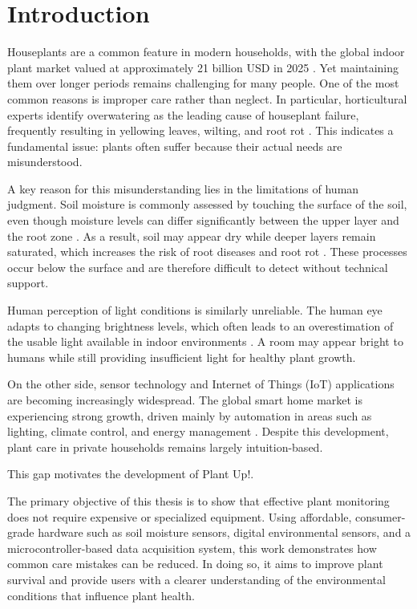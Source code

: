 \section{Introduction}

Houseplants are a common feature in modern households, with the global indoor plant market valued at approximately 21 billion USD in 2025 \cite{terrariumTribeStats2024}. Yet maintaining them over longer periods remains challenging for many people. One of the most common reasons is improper care rather than neglect. In particular, horticultural experts identify overwatering as the leading cause of houseplant failure, frequently resulting in yellowing leaves, wilting, and root rot \cite{lsuWaterWisely}. This indicates a fundamental issue: plants often suffer because their actual needs are misunderstood.

A key reason for this misunderstanding lies in the limitations of human judgment. Soil moisture is commonly assessed by touching the surface of the soil, even though moisture levels can differ significantly between the upper layer and the root zone \cite{lsuWaterWisely}. As a result, soil may appear dry while deeper layers remain saturated, which increases the risk of root diseases and root rot \cite{rootRotsWisc}. These processes occur below the surface and are therefore difficult to detect without technical support.

Human perception of light conditions is similarly unreliable. The human eye adapts to changing brightness levels, which often leads to an overestimation of the usable light available in indoor environments \cite{frontiersLightAdaptation}. A room may appear bright to humans while still providing insufficient light for healthy plant growth.

On the other side, sensor technology and Internet of Things (IoT) applications are becoming increasingly widespread. The global smart home market is experiencing strong growth, driven mainly by automation in areas such as lighting, climate control, and energy management \cite{marketsandmarketsSmartHome2024,precedenceSmartHome2025}. Despite this development, plant care in private households remains largely intuition-based.

This gap motivates the development of Plant Up!.

The primary objective of this thesis is to show that effective plant monitoring does not require expensive or specialized equipment. Using affordable, consumer-grade hardware such as soil moisture sensors, digital environmental sensors, and a microcontroller-\allowbreak based data acquisition system, this work demonstrates how common care mistakes can be reduced. In doing so, it aims to improve plant survival and provide users with a clearer understanding of the environmental conditions that influence plant health.


